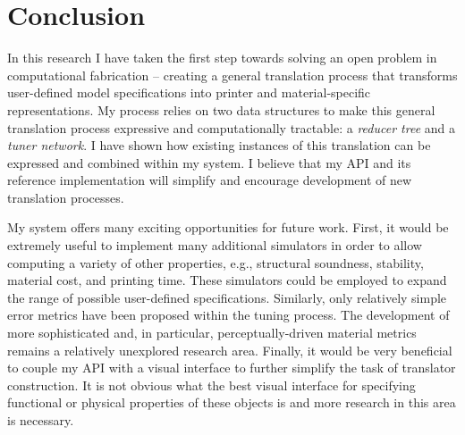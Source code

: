 \chapter{Conclusion}
In this research I have taken the first step towards solving an open problem in computational fabrication -- 
creating a general translation process that transforms user-defined model specifications into printer and material-specific representations.
My process relies on two data structures to make this general translation process expressive and computationally tractable: a \emph{reducer tree} and a \emph{tuner network}.
I have shown how existing instances of this translation can be expressed and combined within my system.
I believe that my API and its reference implementation will simplify and encourage development of new translation processes.

My system offers many exciting opportunities for future work.
First, it would be extremely useful to implement many additional simulators in order to allow computing a variety of other properties, e.g., structural soundness, stability, material cost, and printing time.
These simulators could be employed to expand the range of possible user-defined specifications.
Similarly, only relatively simple error metrics have been proposed within the tuning process.
The development of more sophisticated and, in particular, perceptually-driven material metrics remains a relatively unexplored research area.
Finally, it would be very beneficial to couple my API with a visual interface to further simplify the task of translator construction.
It is not obvious what the best visual interface for specifying functional or physical properties of these objects is and more research in this area is necessary.
